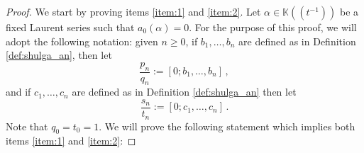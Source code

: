 \documentclass[a4paper,12pt]{article}
\def\fq{\bbk}
\def\fttt{\fq\!\left(\!\left(t^{-1}\right)\!\right)}
\def\defeq{:=}
\def\bbn{\mathbb{N}}
\def\bbk{\mathbb{K}}
\def\defeq{:=}
\newcommand{\DG}[1]{
\begin{tcolorbox}[colback=green,colframe=black]
   {\textbf{DG: #1}}
\end{tcolorbox}
}
\begin{document}
\begin{proof}
We start by proving items \ref{item:1} and \ref{item:2}.
Let $\alpha\in\fttt$ be a fixed Laurent series such that $a_0(\alpha)=0$. For the purpose of this proof, we will adopt the following notation: given $n\geq0$, if $b_1,\ldots,b_n$ are defined as in Definition \eqref{def:shulga_an}, then let
\begin{equation*}%
    \frac{p_n}{q_n}\defeq[0;b_1,\ldots,b_n]\,,
\end{equation*}
and if $c_1,\ldots,c_{n}$ are defined as in Definition \ref{def:shulga_an} then let
\begin{equation*}%
    \frac{s_n}{t_n}\defeq[0;c_1,\ldots,c_n]\,.    
\end{equation*}
Note that $q_0=t_0=1$. We will prove the following statement which implies both items \ref{item:1} and \ref{item:2}: 


\end{proof}
\end{document}
